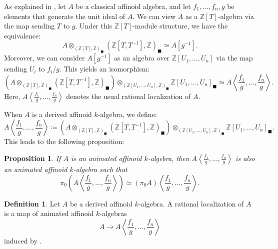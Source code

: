 \documentclass[oneside, hidelinks, 12pt, a4paper,reqno]{amsart}
\theoremstyle{plain}
\theoremstyle{definition}
\newtheorem{definition}[definition]{Definition}
\theoremstyle{plain}
\newtheorem{proposition}[proposition]{Proposition}
\newcommand{\Z}{\mathbb Z}
\newcommand{\Solid}{\blacksquare}
\begin{document}
As explained in \cite[Lemma 2.24]{mikami2023fppfdescentcondensedanimatedrings}, let $A$ be a classical affinoid algebra, and let $f_{1},\dots, f_{n}, g$ be elements that generate the unit ideal of $A$. We can view $A$ as a $\Z[T]$-algebra via the map sending $T$ to $g$. Under this $\Z[T]$-module structure, we have the equivalence: 
\begin{equation*}
    A \otimes_{(\Z[T],\Z)_{\Solid}} (\Z[T,T^{-1}], \Z)_{\Solid} \simeq A[g^{-1}].
\end{equation*}
Moreover, we can consider $A[g^{-1}]$ as an algebra over $\Z[U_{1},\dots, U_{n}]$ via the map sending $U_{i}$ to $f_{i}/g$. This yields an isomorphism: 
\begin{equation*}
    (A \otimes_{(\Z[T],\Z)_{\Solid}} (\Z[T,T^{-1}], \Z)_{\Solid})\otimes_{(\Z[U_{1},\dots, U_{n}],\Z)_{\Solid}} \Z[U_{1},\dots, U_{n}]_{\Solid} \simeq A\left\langle \frac{f_1}{g}, \dots, \frac{f_n}{g} \right\rangle.
\end{equation*}
Here, $A\left\langle \frac{f_1}{g}, \dots, \frac{f_n}{g} \right\rangle$ denotes the usual rational localization of $A$. 

When $A$ is a derived affinoid $k$-algebra, we define: 
\begin{equation}\label{eq: rational loc}
    A\left\langle \frac{f_1}{g}, \dots, \frac{f_n}{g} \right\rangle \coloneqq
    (A \otimes_{(\Z[T],\Z)_{\Solid}} (\Z[T,T^{-1}], \Z)_{\Solid}) \otimes_{(\Z[U_{1},\dots, U_{n}],\Z)_{\Solid}} \Z[U_{1},\dots, U_{n}]_{\Solid}.
\end{equation}
This leads to the following proposition:

\begin{proposition}\cite[Proposition 2.25]{mikami2023fppfdescentcondensedanimatedrings}
    If $A$ is an animated affinoid $k$-algebra, then $A\left\langle \frac{f_1}{g}, \dots, \frac{f_n}{g}\right\rangle$ is also an animated affinoid $k$-algebra such that
\[ \pi_0 \left(A\left\langle \frac{f_1}{g}, \dots, \frac{f_n}{g}\right\rangle\right) \simeq (\pi_0 A)\left\langle \frac{f_1}{g}, \dots, \frac{f_n}{g} \right\rangle. \]
\end{proposition}

\begin{definition}\cite[Definition 2.26]{mikami2023fppfdescentcondensedanimatedrings}
    Let $A$ be a derived affinoid $k$-algebra. A rational localization of $A$ is a map of animated affinoid $k$-algebras   
    \begin{equation*}
        A \to A\left\langle \frac{f_1}{g}, \dots, \frac{f_n}{g} \right\rangle
    \end{equation*}
    induced by .
\end{definition}
\end{document}
